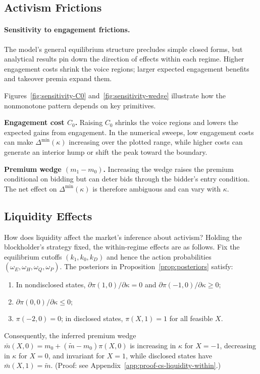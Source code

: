 \documentclass[11pt]{article}
\newcommand{\1}{\mathbf{1}}
\begin{document}
%
\subsection{Activism Frictions}
%

\paragraph{Sensitivity to engagement frictions.}
The model's general equilibrium structure precludes simple closed forms, but analytical results pin down the direction of effects within each regime. Higher engagement costs shrink the voice regions; larger expected engagement benefits and takeover premia expand them.

Figures~\ref{fig:sensitivity-C0} and~\ref{fig:sensitivity-wedge} illustrate how the nonmonotone pattern depends on key primitives.

\textbf{Engagement cost $C_0$.} Raising $C_0$ shrinks the voice regions and lowers the expected gains from engagement. In the numerical sweeps, low engagement costs can make $\Delta^{\min}(\kappa)$ increasing over the plotted range, while higher costs can generate an interior hump or shift the peak toward the boundary.

\textbf{Premium wedge $(m_1 - m_0)$.} Increasing the wedge raises the premium conditional on bidding but can deter bids through the bidder's entry condition. The net effect on $\Delta^{\min}(\kappa)$ is therefore ambiguous and can vary with $\kappa$.

%
\subsection{Liquidity Effects}
%

How does liquidity affect the market's inference about activism? Holding the blockholder's strategy fixed, the within-regime effects are as follows. Fix the equilibrium cutoffs $(k_1,k_0,k_D)$ and hence the action probabilities $(\omega_E,\omega_H,\omega_Q,\omega_P)$. The posteriors in Proposition~\ref{prop:posteriors} satisfy:
\begin{enumerate}[label=\textup{(\alph*)},leftmargin=2em]
\item In nondisclosed states, $\partial \pi(1,0)/\partial \kappa = 0$ and $\partial \pi(-1,0)/\partial \kappa \ge 0$;
\item $\partial \pi(0,0)/\partial \kappa \le 0$;
\item $\pi(-2,0)=0$; in disclosed states, $\pi(X,1)=1$ for all feasible $X$.
\end{enumerate}
Consequently, the inferred premium wedge $\bar{m}(X,0)=m_0+(\tilde{m}-m_0)\pi(X,0)$ is increasing in $\kappa$ for $X=-1$, decreasing in $\kappa$ for $X=0$, and invariant for $X=1$, while disclosed states have $\bar{m}(X,1)=\tilde{m}$. (Proof: see Appendix~\ref{app:proof-cs-liquidity-within}.)
\end{document}

